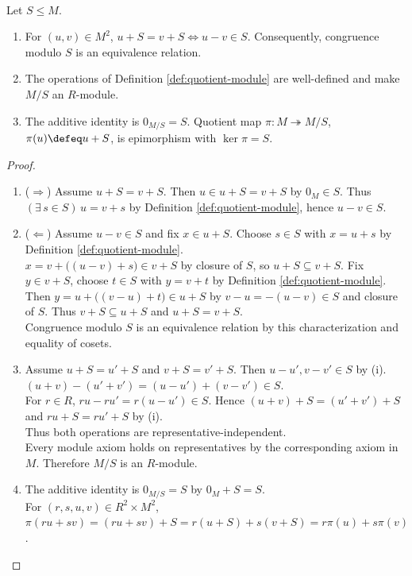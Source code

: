 \begin{proposition} \label{prop:quotient-module-well-defined} \\
Let $S\leq M$.
\begin{enumerate}[label=(\roman*)]
\setlength{\itemsep}{0pt}
\item For $(u,v)\in M^2$, $u+S=v+S\Longleftrightarrow u-v\in S$. Consequently, congruence modulo $S$ is an equivalence relation.
\item The operations of Definition \ref{def:quotient-module} are well-defined and make $M/S$ an $R$-module.
\item The additive identity is $0_{M/S}=S$. Quotient map $\pi:M\twoheadrightarrow M/S$, $\pi(u)\defeq u+S$, is epimorphism with $\ker\pi=S$.
\end{enumerate}
\begin{proof}
\begin{enumerate}[label=(\roman*)]
\setlength{\itemsep}{0pt}
\item[$(i)$] ($\Rightarrow$) Assume $u+S=v+S$. Then $u\in u+S=v+S$ by $0_M\in S$. Thus $(\exists\,s\in S)\,u=v+s$ by Definition \ref{def:quotient-module}, hence $u-v\in S$.
\item[$(i)$] ($\Leftarrow$) Assume $u-v\in S$ and fix $x\in u+S$. Choose $s\in S$ with $x=u+s$ by Definition \ref{def:quotient-module}.\\
$x=v+\bigl((u-v)+s\bigr)\in v+S$ by closure of $S$, so $u+S\subseteq v+S$. Fix $y\in v+S$, choose $t\in S$ with $y=v+t$ by Definition \ref{def:quotient-module}.\\
Then $y=u+\bigl((v-u)+t\bigr)\in u+S$ by $v-u=-(u-v)\in S$ and closure of $S$. Thus $v+S\subseteq u+S$ and $u+S=v+S$.\\
Congruence modulo $S$ is an equivalence relation by this characterization and equality of cosets.
\item[$(ii)$] Assume $u+S=u'+S$ and $v+S=v'+S$. Then $u-u',v-v'\in S$ by (i). $(u+v)-(u'+v')=(u-u')+(v-v')\in S$.\\
For $r\in R$, $ru-ru'=r(u-u')\in S$. Hence $(u+v)+S=(u'+v')+S$ and $ru+S=ru'+S$ by (i).\\
Thus both operations are representative-independent.\\
Every module axiom holds on representatives by the corresponding axiom in $M$. Therefore $M/S$ is an $R$-module.
\item[$(iii)$] The additive identity is $0_{M/S}=S$ by $0_M+S=S$.\\
For $(r,s,u,v)\in R^2\times M^2$, $\pi(ru+sv)=(ru+sv)+S=r(u+S)+s(v+S)=r\pi(u)+s\pi(v)$.\\

\end{enumerate}
\end{proof}
\end{proposition}

